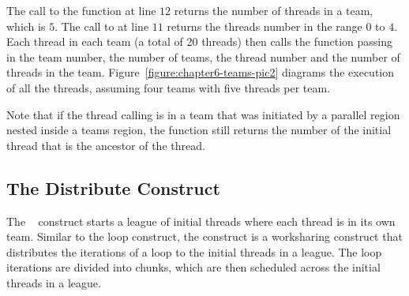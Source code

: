 The call to the  function at line $12$ returns the
number of threads in a team, which is $5$. The call to 
at line $11$ returns the threads number in the range $0$ to $4$.
Each thread in each team (a total of 20 threads) then calls the function
 passing in the team number, the number of teams, the thread number and
the number of threads in the team.  Figure~\ref{figure:chapter6-teams-pic2} diagrams
the execution of all the threads, assuming four teams with five threads per
team.

Note that if the thread calling  is in a team that was
initiated by a parallel region nested inside a teams region, the function still
returns the number of the initial thread that is the ancestor of the thread.

\begin{figure*}[!tbh]
\centering
{}
\caption{ \textbf{The initial threads created by the teams construct each
               become the master of a new team of threads.  } -- \small
        Each initial thread starts execution as team of one thread.  The initial threads
        execute the teams region in parallel and immediately encounter
        a parallel construct.  Each initial thread then becomes the
        master of a new team of threads.
        }
\label{figure:chapter6-teams-pic2}
\end{figure*}

\subsection{The Distribute Construct}
\label{ssec:06.distribute-construct}

The ~ construct starts a league of initial threads where each
thread is in its own team.  Similar to the loop construct, the
 construct is a worksharing construct that distributes
the iterations of a loop to the initial threads in a league.  The loop
iterations are divided into chunks, which are then scheduled across the initial
threads in a league.

